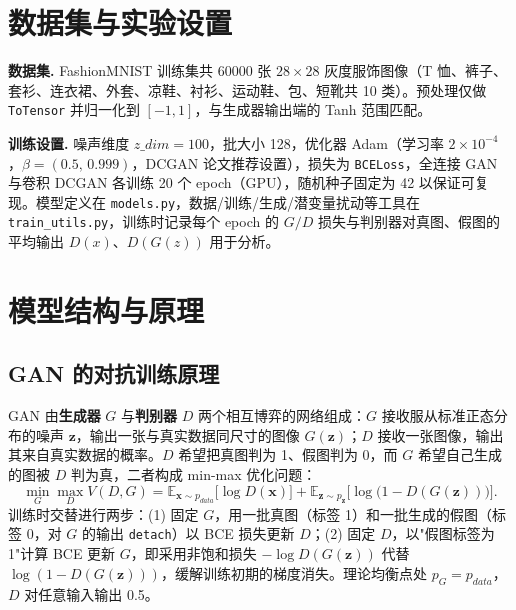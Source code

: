 \documentclass[a4paper]{article}
\begin{document}
\section{数据集与实验设置}
\textbf{数据集.} FashionMNIST 训练集共 60000 张 $28\times 28$ 灰度服饰图像（T 恤、裤子、套衫、连衣裙、外套、凉鞋、衬衫、运动鞋、包、短靴共 10 类）。预处理仅做 \texttt{ToTensor} 并归一化到 $[-1,1]$，与生成器输出端的 Tanh 范围匹配。

\textbf{训练设置.} 噪声维度 $z\_dim=100$，批大小 128，优化器 Adam（学习率 $2\times 10^{-4}$，$\beta=(0.5,\,0.999)$，DCGAN 论文推荐设置），损失为 \texttt{BCELoss}，全连接 GAN 与卷积 DCGAN 各训练 20 个 epoch（GPU），随机种子固定为 42 以保证可复现。模型定义在 \texttt{models.py}，数据/训练/生成/潜变量扰动等工具在 \texttt{train\_utils.py}，训练时记录每个 epoch 的 $G/D$ 损失与判别器对真图、假图的平均输出 $D(x)$、$D(G(z))$ 用于分析。

\section{模型结构与原理}
\subsection{GAN 的对抗训练原理}
GAN 由\textbf{生成器} $G$ 与\textbf{判别器} $D$ 两个相互博弈的网络组成：$G$ 接收服从标准正态分布的噪声 $\bm{z}$，输出一张与真实数据同尺寸的图像 $G(\bm{z})$；$D$ 接收一张图像，输出其来自真实数据的概率。$D$ 希望把真图判为 1、假图判为 0，而 $G$ 希望自己生成的图被 $D$ 判为真，二者构成 min-max 优化问题：
\begin{equation}
  \min_{G}\max_{D} V(D,G)=\mathbb{E}_{\bm{x}\sim p_{data}}\big[\log D(\bm{x})\big]
  +\mathbb{E}_{\bm{z}\sim p_{\bm{z}}}\big[\log\big(1-D(G(\bm{z}))\big)\big].
\end{equation}
训练时交替进行两步：(1) 固定 $G$，用一批真图（标签 1）和一批生成的假图（标签 0，对 $G$ 的输出 \texttt{detach}）以 BCE 损失更新 $D$；(2) 固定 $D$，以"假图标签为 1"计算 BCE 更新 $G$，即采用非饱和损失 $-\log D(G(\bm{z}))$ 代替 $\log(1-D(G(\bm{z})))$，缓解训练初期的梯度消失。理论均衡点处 $p_G=p_{data}$，$D$ 对任意输入输出 0.5。
\end{document}
